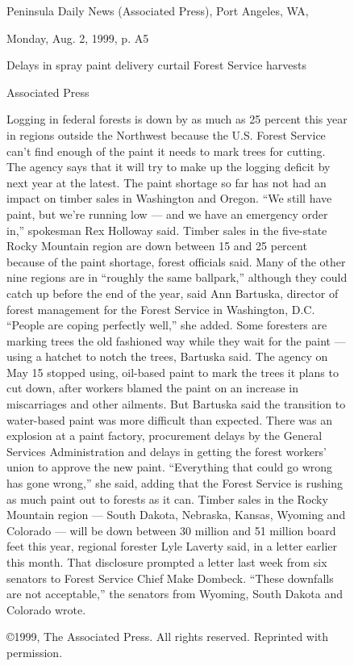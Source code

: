 \begin{figure}
 
Peninsula Daily News
(Associated Press), Port Angeles, WA,

Monday, Aug. 2, 1999, p. A5

Delays in spray paint delivery curtail Forest Service harvests

Associated Press

Logging in federal forests is down by as much as 25 percent this year in regions
outside the Northwest because the U.S. Forest Service can’t find enough of the paint
it needs to mark trees for cutting. The agency says that it will try to make up the
logging deficit by next year at the latest.
The paint shortage so far has not had an impact on timber sales in Washington
and Oregon. “We still have paint, but we’re running low — and we have an emergency
order in,” spokesman Rex Holloway said.
Timber sales in the five-state Rocky Mountain region are down between 15 and
25 percent because of the paint shortage, forest officials said. Many of the other nine
regions are in “roughly the same ballpark,” although they could catch up before the
end of the year, said Ann Bartuska, director of forest management for the Forest
Service in Washington, D.C. “People are coping perfectly well,” she added.
Some foresters are marking trees the old fashioned way while they wait for the
paint — using a hatchet to notch the trees, Bartuska said.
The agency on May 15 stopped using, oil-based paint to mark the trees it plans
to cut down, after workers blamed the paint on an increase in miscarriages and other
ailments. But Bartuska said the transition to water-based paint was more difficult
than expected. There was an explosion at a paint factory, procurement delays by the
General Services Administration and delays in getting the forest workers’ union to
approve the new paint.
“Everything that could go wrong has gone wrong,” she said, adding that the Forest
Service is rushing as much paint out to forests as it can.
Timber sales in the Rocky Mountain region — South Dakota, Nebraska, Kansas,
Wyoming and Colorado — will be down between 30 million and 51 million board
feet this year, regional forester Lyle Laverty said, in a letter earlier this month. That
disclosure prompted a letter last week from six senators to Forest Service Chief Make
Dombeck.
``These downfalls are not acceptable,''  the senators from Wyoming, South Dakota
and Colorado wrote.

\copyright 1999, The Associated Press. All rights reserved. Reprinted with permission.

\end{figure}


